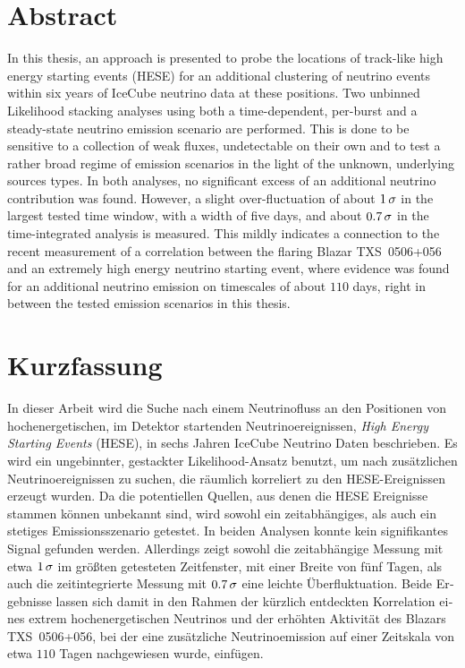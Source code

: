 \thispagestyle{plain}

\section*{Abstract}
In this thesis, an approach is presented to probe the locations of track-like high energy starting events (HESE) for an additional clustering of neutrino events within six years of IceCube neutrino data at these positions.
Two unbinned Likelihood stacking analyses using both a time-dependent, per-burst and a steady-state neutrino emission scenario are performed.
This is done to be sensitive to a collection of weak fluxes, undetectable on their own and to test a rather broad regime of emission scenarios in the light of the unknown, underlying sources types.
In both analyses, no significant excess of an additional neutrino contribution was found.
However, a slight over-fluctuation of about $\num{1}\,\sigma$ in the largest tested time window, with a width of five days, and about $\num{0.7}\,\sigma$ in the time-integrated analysis is measured.
This mildly indicates a connection to the recent measurement of a correlation between the flaring Blazar TXS~0506+056 and an extremely high energy neutrino starting event, where evidence was found for an additional neutrino emission on timescales of about $\num{110}$ days, right in between the tested emission scenarios in this thesis.

\section*{Kurzfassung}
\begin{german}
In dieser Arbeit wird die Suche nach einem Neutrinofluss an den Positionen von hochenergetischen, im Detektor startenden Neutrinoereignissen, \emph{High Energy Starting Events} (HESE), in sechs Jahren IceCube Neutrino Daten beschrieben.
Es wird ein ungebinnter, gestackter Likelihood-Ansatz benutzt, um nach zusätzlichen Neutrinoereignissen zu suchen, die räumlich korreliert zu den HESE-Ereignissen erzeugt wurden.
Da die potentiellen Quellen, aus denen die HESE Ereignisse stammen können unbekannt sind, wird sowohl ein zeitabhängiges, als auch ein stetiges Emissionsszenario getestet.
In beiden Analysen konnte kein signifikantes Signal gefunden werden.
Allerdings zeigt sowohl die zeitabhängige Messung mit etwa $\num{1}\,\sigma$ im größten getesteten Zeitfenster, mit einer Breite von fünf Tagen, als auch die zeitintegrierte Messung mit $\num{0.7}\,\sigma$ eine leichte Überfluktuation.
Beide Ergebnisse lassen sich damit in den Rahmen der kürzlich entdeckten Korrelation eines extrem hochenergetischen Neutrinos und der erhöhten Aktivität des Blazars TXS~0506+056, bei der eine zusätzliche Neutrinoemission auf einer Zeitskala von etwa $\num{110}$ Tagen nachgewiesen wurde, einfügen.
\end{german}